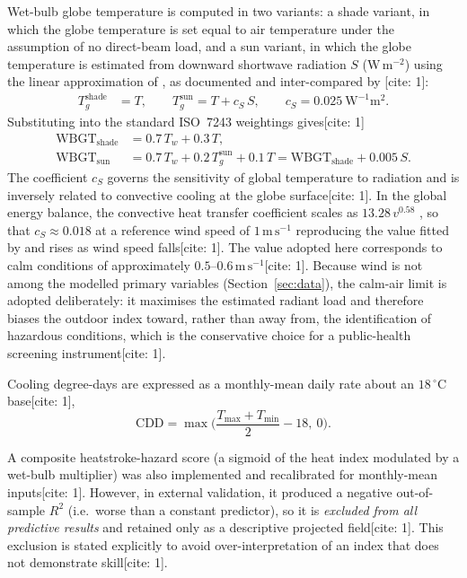 \documentclass[pdflatex,sn-mathphys-ay]{sn-jnl}
\newcommand{\degC}{\ensuremath{^{\circ}\mathrm{C}}}
\begin{document}
Wet-bulb globe temperature is computed in two variants: a shade variant, in which the globe temperature is set equal to air temperature under the assumption of no direct-beam load, and a sun variant, in which the globe temperature is estimated from downward shortwave radiation $S$ ($\mathrm{W\,m^{-2}}$) using the linear approximation of \citet{tonouchi2006}, as documented and inter-compared by \citet{lemke2012}[cite: 1]:
\begin{align}
T_g^{\text{shade}} &= T, \qquad
T_g^{\text{sun}} = T + c_S\,S, \qquad c_S = 0.025\ \mathrm{W^{-1}m^{2}}.
\end{align}
Substituting into the standard ISO~7243 weightings \citep{iso7243_2017,yaglou1957} gives[cite: 1]
\begin{align}
\mathrm{WBGT_{shade}} &= 0.7\,T_w + 0.3\,T, \\
\mathrm{WBGT_{sun}}   &= 0.7\,T_w + 0.2\,T_g^{\text{sun}} + 0.1\,T = \mathrm{WBGT_{shade}} + 0.005\,S .
\end{align}
The coefficient $c_S$ governs the sensitivity of global temperature to radiation and is inversely related to convective cooling at the globe surface[cite: 1]. In the global energy balance, the convective heat transfer coefficient scales as $13.28\,v^{0.58}$ \citep{lemke2012}, so that $c_S \approx 0.018$ at a reference wind speed of $1\,\mathrm{m\,s^{-1}}$ reproducing the value fitted by \citet{tonouchi2006} and rises as wind speed falls[cite: 1]. The value adopted here corresponds to calm conditions of approximately $0.5$--$0.6\,\mathrm{m\,s^{-1}}$[cite: 1]. Because wind is not among the modelled primary variables (Section~\ref{sec:data}), the calm-air limit is adopted deliberately: it maximises the estimated radiant load and therefore biases the outdoor index toward, rather than away from, the identification of hazardous conditions, which is the conservative choice for a public-health screening instrument[cite: 1].

Cooling degree-days are expressed as a monthly-mean daily rate about an $18\,\degC$ base[cite: 1],
\begin{equation}
\mathrm{CDD}=\max\!\Big(\frac{T_{\max}+T_{\min}}{2}-18,\ 0\Big).
\label{eq:cdd}
\end{equation}

A composite heatstroke-hazard score (a sigmoid of the heat index modulated by a wet-bulb multiplier) was also implemented and recalibrated for monthly-mean inputs[cite: 1]. However, in external validation, it produced a negative out-of-sample $R^{2}$ (i.e.\ worse than a constant predictor), so it is \emph{excluded from all predictive results} and retained only as a descriptive projected field[cite: 1]. This exclusion is stated explicitly to avoid over-interpretation of an index that does not demonstrate skill[cite: 1].
\end{document}
